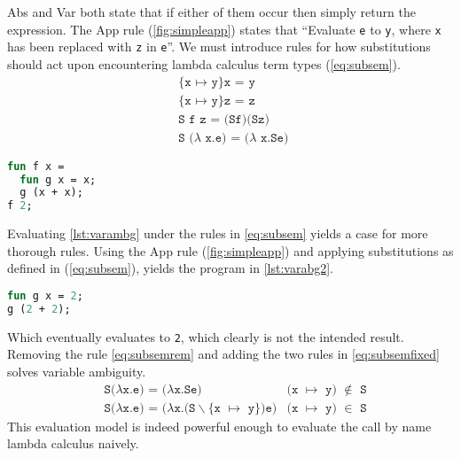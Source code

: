 \documentclass[11pt,oneside,a4paper]{report}
\begin{document}
Abs and Var both state that if either of them occur then simply return the expression.
The App rule (\autoref{fig:simpleapp}) states that ``Evaluate \texttt{e} to \texttt{y}, where \texttt{x} has been replaced with \texttt{z} in \texttt{e}''.
We must introduce rules for how substitutions should act upon encountering lambda calculus term types (\autoref{eq:subsem}).
\begin{align}
  &\texttt{\{x $\mapsto$ y\} x = y} \label{eq:subsem}\\
  &\texttt{\{x $\mapsto$ y\} z = z}  \tag*{}\\
  &\texttt{S f z = (Sf)(Sz)} \tag*{}\\
  &\texttt{S ($\lambda$ x.e) = ($\lambda$ x.Se) } \label{eq:subsemrem}%
\end{align}

\begin{lstlisting}[language=ML,caption={Program with variable ambiguity},label={lst:varambg},mathescape=true]
fun f x =
  fun g x = x;
  g (x + x);
f 2;
\end{lstlisting}
Evaluating \autoref{lst:varambg} under the rules in \autoref{eq:subsem} yields a case for more thorough rules.
Using the App rule (\autoref{fig:simpleapp}) and applying substitutions as defined in (\autoref{eq:subsem}), yields the program in \autoref{lst:varabg2}.
\begin{lstlisting}[language=ML,caption={Program with variable ambiguity},label={lst:varambg2},mathescape=true]
fun g x = 2;
g (2 + 2);
\end{lstlisting}
Which eventually evaluates to \texttt{2}, which clearly is not the intended result.
Removing the rule \autoref{eq:subsemrem} and adding the two rules in \autoref{eq:subsemfixed} solves variable ambiguity.
\begin{align}
  &\texttt{S($\lambda$x.e) = ($\lambda$x.Se)} & \texttt{(x $\mapsto$ y) $\notin$ S} \label{eq:subsemfixed}\\
  &\texttt{S($\lambda$x.e) = ($\lambda$x.(S$\backslash$\{x $\mapsto$ y\})e)} & \texttt{(x $\mapsto$ y) $\in$ S} \tag*{}
\end{align}
This evaluation model is indeed powerful enough to evaluate the call by name lambda calculus naively.
\end{document}
